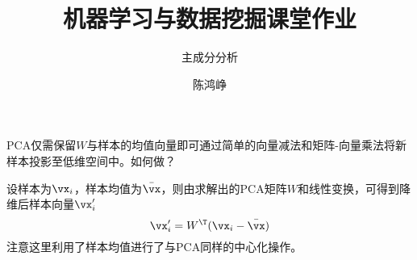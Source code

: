 \documentclass[logo,reportComp]{thesis}
\title{机器学习与数据挖掘课堂作业}
\subtitle{主成分分析}
\author{陈鸿峥}
\begin{document}
\maketitle

\begin{question}
PCA仅需保留$W$与样本的均值向量即可通过简单的向量减法和矩阵-向量乘法将新样本投影至低维空间中。如何做？
\end{question}
\begin{answer}
设样本为$\vx_i$，样本均值为$\bar{\vx}$，则由求解出的PCA矩阵$W$和线性变换，可得到降维后样本向量$\vx_i'$
\[\vx_i'=W^\T(\vx_i-\bar{\vx})\]
注意这里利用了样本均值进行了与PCA同样的中心化操作。
\end{answer}
\end{document}
